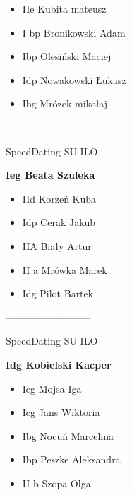 \documentclass[a4paper,10pt]{article}
\begin{document}
\begin{multicols}{3}
\begin{minipage}[l]{\textwidth}
  \begin{itemize}
    \item IIe Kubita mateusz
    \item I bp Bronikowski Adam
    \item Ibp Olesiński Maciej
    \item Idp Nowakowski Łukasz
    \item Ibg Mrózek mikołaj

    \end{itemize}



\end{minipage}



\begin{minipage}[l]{\textwidth}
--------------------------

  \footnotesize{SpeedDating SU ILO}

  \bfseries{Ieg Beata Szuleka}

  \begin{itemize}
    \item IId Korzeń Kuba
    \item Idp Cerak Jakub
    \item IIA Biały Artur
    \item II a Mrówka Marek
    \item Idg Pilot Bartek

    \end{itemize}



\end{minipage}



\begin{minipage}[l]{\textwidth}
--------------------------

  \footnotesize{SpeedDating SU ILO}

  \bfseries{Idg Kobielski Kacper}

  \begin{itemize}
    \item Ieg Mojsa Iga
    \item Icg Jans Wiktoria
    \item Ibg Nocuń Marcelina
    \item Ibp Peszke Aleksandra
    \item II b Szopa Olga

    \end{itemize}




\end{minipage}
\end{multicols}
\end{document}
